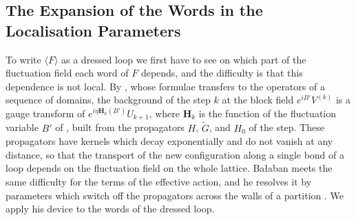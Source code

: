\documentclass[11pt]{preprint}
\numberwithin{equation}{section}
\theoremstyle{definition}
\theoremstyle{remark}
\theoremstyle{plain}
\begin{document}
\subsection{The Expansion of the Words in the Localisation Parameters}\label{sec:localisation-expansion}

To write $\langle F\rangle$ as a dressed loop we first have to see on which part of the fluctuation field each word of $F$ depends, and the difficulty is that this dependence is not local. By \cite[p.~265 and (2.6), p.~266]{BalabanRG1}, whose formulae \cite[p.~267]{BalabanCRE} transfers to the operators of a sequence of domains, the background of the step $k$ at the block field $e^{iB'}V^{(k)}$ is a gauge transform of $e^{i\eta\mathbf H_k(B')}U_{k+1}$, where $\mathbf H_k$ is the function \cite[(1.17), p.~6]{BalabanRG2} of the fluctuation variable $B'$ of \cite[(1.19), p.~6]{BalabanRG2}, built from the propagators $H$, $\tilde G$, and $H_0$ of the step. These propagators have kernels which decay exponentially and do not vanish at any distance, so that the transport of the new configuration along a single bond of a loop depends on the fluctuation field on the whole lattice. Ba{\l}aban meets the same difficulty for the terms of the effective action, and he resolves it by parameters which switch off the propagators across the walls of a partition \cite[pp.~3--7]{BalabanRG2}. We apply his device to the words of the dressed loop.
\end{document}

